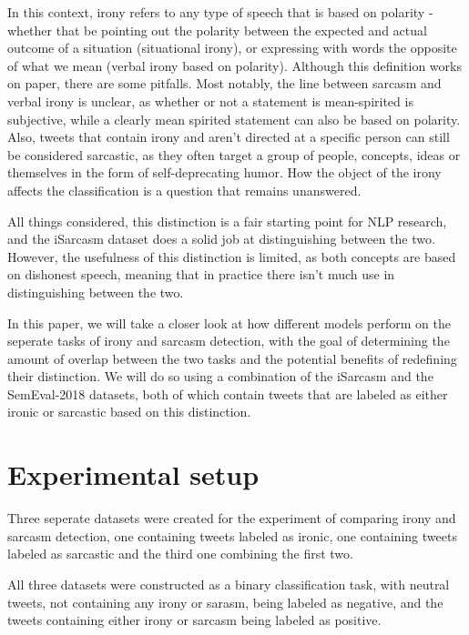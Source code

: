 \documentclass[10pt, a4paper]{article}
\begin{document}
In this context, irony refers to any type of speech that is based on polarity - whether that be pointing out the polarity 
between the expected and actual outcome of a situation (situational irony), or expressing with words the opposite of what 
we mean (verbal irony based on polarity). Although this definition works on paper, there are some pitfalls. Most notably, 
the line between sarcasm and verbal irony is unclear, as whether or not a statement is mean-spirited is subjective, while 
a clearly mean spirited statement can also be based on polarity. Also, tweets that contain irony and aren’t directed at a 
specific person can still be considered sarcastic, as they often target a group of people, concepts, ideas or themselves 
in the form of self-deprecating humor. How the object of the irony affects the classification is a question that remains unanswered.

All things considered, this distinction is a fair starting point for NLP research, and the iSarcasm \citep{iSarcasm} dataset
does a solid job at distinguishing between the two. However, the usefulness of this distinction is limited, as both concepts
are based on dishonest speech, meaning that in practice there isn't much use in distinguishing between the two.

In this paper, we will take a closer look at how different models perform on the seperate tasks of irony and sarcasm detection,
with the goal of determining the amount of overlap between the two tasks and the potential benefits of redefining their distinction.
We will do so using a combination of the iSarcasm \citep{iSarcasm} and the SemEval-2018 \citep{semeval-2018} 
datasets, both of which contain tweets that are labeled as either ironic or sarcastic based on this distinction.

\section{Experimental setup}

Three seperate datasets were created for the experiment of comparing irony and sarcasm detection, one containing tweets labeled
as ironic, one containing tweets labeled as sarcastic and the third one combining the first two.

All three datasets were constructed as a binary classification task, with neutral tweets, not containing any irony or sarasm,
being labeled as negative, and the tweets containing either irony or sarcasm being labeled as positive.
\end{document}
